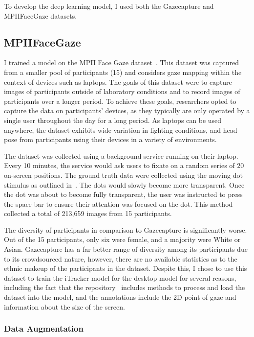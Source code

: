 \documentclass{report}
\begin{document}
To develop the deep learning model, I used both the Gazecapture and MPIIFaceGaze datasets. 

\subsection{MPIIFaceGaze}\label{ssec:mpii-face-gaze}

I trained a model on the MPII Face Gaze dataset~\cite{zhang2019mpii}. This dataset was captured from a smaller pool of participants (15) and considers gaze mapping within the context of devices such as laptops. The goals of this dataset were to capture images of participants outside of laboratory conditions and to record images of participants over a longer period. To achieve these goals, researchers opted to capture the data on participants' devices, as they typically are only operated by a single user throughout the day for a long period. As laptops can be used anywhere, the dataset exhibits wide variation in lighting conditions, and head pose from participants using their devices in a variety of environments. 

The dataset was collected using a background service running on their laptop. Every 10 minutes, the service would ask users to fixate on a random series of 20 on-screen positions. The ground truth data were collected using the moving dot stimulus as outlined in~\cite{kassner2014pupil}. The dots would slowly become more transparent. Once the dot was about to become fully transparent, the user was instructed to press the space bar to ensure their attention was focused on the dot. This method collected a total of 213,659 images from 15 participants. 

The diversity of participants in comparison to Gazecapture is significantly worse. Out of the 15 participants, only six were female, and a majority were White or Asian. Gazecapture has a far better range of diversity among its participants due to its crowdsourced nature, however, there are no available statistics as to the ethnic makeup of the participants in the dataset. Despite this, I chose to use this dataset to train the iTracker model for the desktop model for several reasons, including the fact that the repository~\cite{krafka2016eye,cheng2021survey} includes methods to process and load the dataset into the model, and the annotations include the 2D point of gaze and information about the size of the screen. 

\subsubsection{Data Augmentation}
\end{document}

